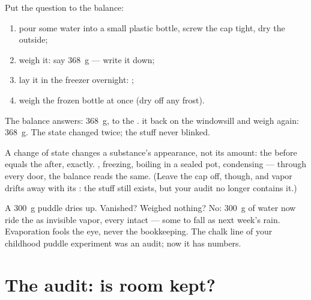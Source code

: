 \begin{method}\label{met:g6:water-states:weigh}
Put the question to the balance:
\begin{enumerate}
  \item pour some water into a small plastic bottle, screw the cap
        tight, dry the outside;
  \item weigh it: say \qty{368}{g} --- write it down;
  \item lay it in the freezer overnight: ;
  \item weigh the frozen bottle at once (dry off any frost).
\end{enumerate}
The balance answers: \qty{368}{g}, to the .  it back on
the windowsill and weigh again: \qty{368}{g}. The state changed
twice; the stuff never blinked.
\end{method}

\begin{proposition}\label{prop:g6:water-states:mass}
A change of state changes a substance's appearance, not its
amount: the  before equals the  after, exactly. ,
freezing, boiling in a sealed pot, condensing --- through every
door, the balance reads the same. (Leave the cap off, though, and
vapor drifts away with its : the stuff still exists, but your
audit no longer contains it.)
\end{proposition}

\begin{example}\label{ex:g6:water-states:puddle}
A \qty{300}{g} puddle dries up. Vanished? Weighed nothing? No:
\qty{300}{g} of water now ride the  as invisible vapor, every
 intact --- some to fall as next week's rain. Evaporation
fools the eye, never the bookkeeping. The chalk line of your
childhood puddle experiment was an audit; now it has numbers.
\end{example}

\section{The audit: is room kept?}

